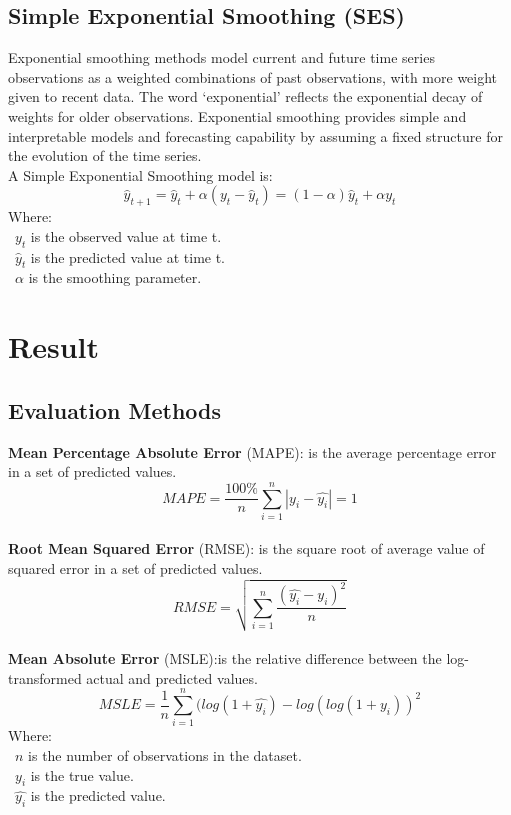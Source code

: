 \documentclass{ieeeojies}
\begin{document}
\subsection{Simple Exponential Smoothing (SES)}
Exponential smoothing methods model current and future time series observations as a weighted combinations of past observations, with more weight given to recent data. The word ‘exponential’ reflects the exponential decay of weights for older observations. Exponential smoothing provides simple and interpretable models and forecasting capability by assuming a fixed structure for the evolution of the time series.\\
A Simple Exponential Smoothing model is:
\[\hat{y}_{t+1} = \hat{y}_t + \alpha(y_t - \hat{y}_t) = (1 - \alpha)\hat{y}_t + \alpha y_t\]
Where:\\
    \indent\textbullet\ \(y_t\) is the observed value at time t. \\
    \indent\textbullet\ \(\hat{y}_t\) is the predicted value at time t. \\
    \indent\textbullet\ \(\alpha\) is the smoothing parameter.


\section{Result}
\subsection{Evaluation Methods}
\textbf{Mean Percentage Absolute Error} (MAPE): is the average percentage error in a set of predicted values.\\
\[MAPE=\frac{100\%}{n}  \sum_{i=1}^{n} |y_i-\hat{y_i} |  = 1 \]\\
\textbf{Root Mean Squared Error} (RMSE): is the square root of average value of squared error in a set of predicted values.\\
\[RMSE=\sqrt{\sum_{i=1}^{n} \frac{(\hat{y_i}-y_i )^2}{n} }\]\\
\textbf{Mean Absolute Error} (MSLE):is the relative difference between the log-transformed actual and predicted values.\\
\[MSLE=\frac{1}{n}\sum_{i=1}^{n}(log(1+\hat{y_i})-log(log(1+y_i))^2\]
Where: \\
	\indent\textbullet\ \(n\) is the number of observations in the dataset.\\
	\indent\textbullet\ \(y_i\)  is the true value.\\
	\indent\textbullet\ \(\hat{y_i}\) is the predicted value.
\end{document}
